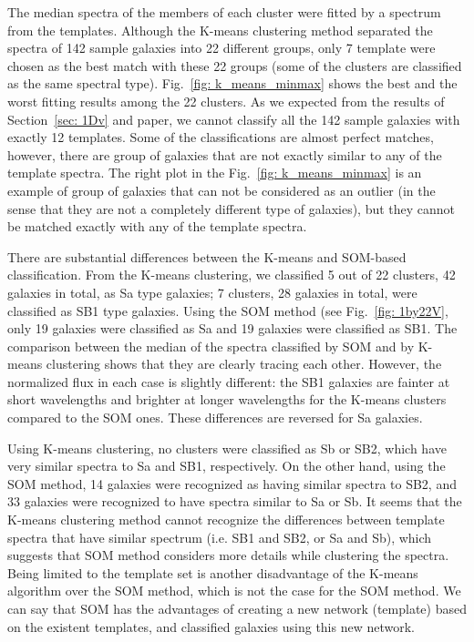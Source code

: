     The median spectra of the members of each cluster were fitted by a spectrum from the  templates.
    Although the K-means clustering method separated the spectra of 142 sample galaxies into 22 different groups, only 7 template were chosen as the best match with these 22 groups (some of the clusters are classified as the same spectral type).
    Fig.~\ref{fig: k_means_minmax} shows the best and the worst fitting results among the 22 clusters. 
    As we expected from the results of Section~\ref{sec: 1Dv} and  paper, we cannot classify all the 142 sample galaxies with exactly 12 templates. 
    Some of the classifications are almost perfect matches, however, there are group of galaxies that are not exactly similar to any of the template spectra.
    The right plot in the Fig.~\ref{fig: k_means_minmax} is an example of group of galaxies that can not be considered as an outlier (in the sense that they are not a completely different type of galaxies), but they cannot be matched exactly with any of the template spectra.

    There are substantial differences between the K-means and SOM-based classification.
    From the K-means clustering, we classified 5 out of 22 clusters, 42 galaxies in total, as Sa type galaxies; 7 clusters, 28 galaxies in total, were classified as SB1 type galaxies.
    Using the SOM method (see Fig.~\ref{fig: 1by22V}, only 19 galaxies were classified as Sa and 19 galaxies were classified as SB1. 
    The comparison between the median of the spectra classified by SOM and by K-means clustering shows that they are clearly tracing each other.
    However, the normalized flux in each case is slightly different: 
    the SB1 galaxies are fainter at short wavelengths and brighter at longer wavelengths for the K-means clusters compared to the SOM ones.
    These differences are reversed for Sa galaxies.
    
    Using K-means clustering, no clusters were classified as Sb or SB2, which have very similar spectra to Sa and SB1, respectively.
    On the other hand, using the SOM method, 14 galaxies were recognized as having similar spectra to SB2, and 33 galaxies were recognized to have spectra similar to Sa or Sb.
    It seems that the K-means clustering method cannot recognize the differences between template spectra that have similar spectrum (i.e. SB1 and SB2, or Sa and Sb), which suggests that SOM method considers more details while clustering the spectra.
    Being limited to the template set is another disadvantage of the K-means algorithm over the SOM method, which is not the case for the SOM method.
    We can say that SOM has the advantages of creating a new network (template) based on the existent templates, and classified galaxies using this new network.
      
